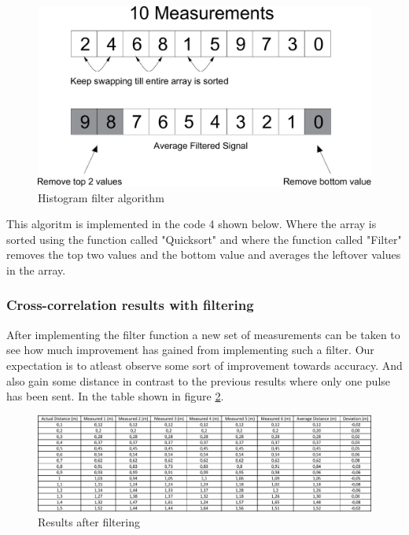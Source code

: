 \documentclass[10pt,a4paper]{article}
\begin{document}
\begin{figure}[H]
   \centering
   \includegraphics[width=\textwidth]{filter.pdf}
   \caption{Histogram filter algorithm}
   \label{fig:filter}
\end{figure}

This algoritm is implemented in the code 4 shown below. Where the array is sorted using the function called "Quicksort" and where the function called "Filter" removes the top two values and the bottom value and averages the leftover values in the array.
\newpage



\subsubsection{Cross-correlation results with filtering}
After implementing the filter function a new set of measurements can be taken to see how much improvement has gained from implementing such a filter. Our expectation is to atleast observe some sort of improvement towards accuracy. And also gain some distance in contrast to the previous results where only one pulse has been sent. In the table shown in figure \ref{fig:filterresults}.

\begin{figure}[H]
   \centering
   \includegraphics[width=\textwidth]{filterresult.pdf}
   \caption{Results after filtering}
   \label{fig:filterresults}
\end{figure}
\end{document}
